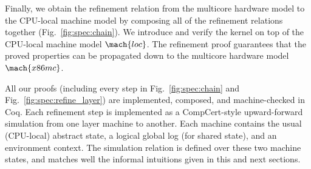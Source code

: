 Finally, we obtain the refinement relation from the multicore hardware
model to the CPU-local machine model by composing all of the
refinement relations together (\cf Fig.~\ref{fig:spec:chain}).  We
introduce and verify the {\mCTOS} kernel on top of the CPU-local
machine model $\mach{loc}$. The refinement proof guarantees that the
proved properties can be propagated down to the multicore hardware
model $\mach{x86mc}$.

All our proofs (including every step in Fig.~\ref{fig:spec:chain} and
Fig.~\ref{fig:spec:refine_layer}) are implemented, composed, and
machine-checked in Coq.  Each refinement step is
implemented as a CompCert-style upward-forward simulation from one
layer machine to another.  Each machine contains the usual (CPU-local)
abstract state, a logical global log (for shared state), and an
environment context.  The simulation relation is defined over these
two machine states, and matches well the informal intuitions given
in this and next sections.

